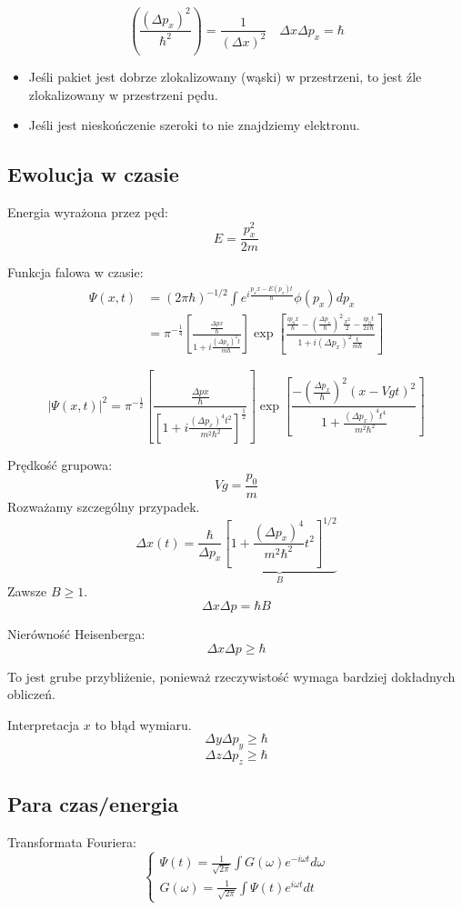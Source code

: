 \[
(\frac{(\Delta p_x)^2}{\hbar^2}) = \frac{1}{(\Delta x)^2} \quad \Delta x \Delta p_x = \hbar
\]
\begin{itemize}
    \item Jeśli pakiet jest dobrze zlokalizowany (wąski) w przestrzeni, to jest źle zlokalizowany w przestrzeni pędu.
    \item Jeśli jest nieskończenie szeroki to nie znajdziemy elektronu.
\end{itemize}

\subsection{Ewolucja w czasie}

Energia wyrażona przez pęd:
\[
E = \frac{p_x^2}{2m}
\]

Funkcja falowa w czasie:
\begin{align*}
\Psi(x,t) &= \left(2\pi\hbar \right)^{-1/2} \int e^{i\frac{p_x x - E(p_x)t}{\hbar}} \phi(p_x) dp_x \\
&= \pi^{-\frac{1}{4}}\left[\frac{\frac{\Delta p x}{\hbar}}{1+i\frac{(\Delta p_x)^2 t}{m\hbar}}\right] \exp\left[\frac{\frac{ip_0 x}{\hbar}-\left(\frac{\Delta p_x}{\hbar}\right)^2\frac{x^2}{2}-\frac{ip_0 t}{2x\hbar}}{1+i(\Delta p_x)^2 \frac{t}{m\hbar}}\right]
\end{align*}

\[
|\Psi(x,t)|^2 = \pi^{-\frac{1}{2}}\left[\frac{\frac{\Delta p x}{\hbar}}{\left[1+i\frac{(\Delta p_x)^4 t^2}{m^2\hbar^2}\right]^{\frac{1}{2}}}\right] \exp\left[\frac{-\left(\frac{\Delta p_x}{\hbar}\right)^2(x-Vgt)^2}{1+\frac{(\Delta p_x)^4 t^4}{m^2\hbar^2}}\right]
\]

Prędkość grupowa:
\[
Vg = \frac{p_0}{m}
\]
Rozważamy szczególny przypadek.
\[
\Delta x (t) = \frac{\hbar}{\Delta p_x} \underbrace{\left[1 + \frac{(\Delta p_x)^4}{m^2\hbar^2}t^2\right]^{1/2}}_{B}
\]
Zawsze $B \geq 1$.
\[
\Delta x \Delta p = \hbar B
\]

Nierówność Heisenberga:
\[
\Delta x \Delta p \geq \hbar
\]

To jest grube przybliżenie, ponieważ rzeczywistość wymaga bardziej dokładnych obliczeń.

Interpretacja $x$ to błąd wymiaru.
\[
\Delta y \Delta p_y \geq \hbar
\]
\[
\Delta z \Delta p_z \geq \hbar
\]

\subsection{Para czas/energia}
Transformata Fouriera:
\[
\begin{cases}
\Psi(t) = \frac{1}{\sqrt{2\pi}} \int G(\omega) e^{-i\omega t} d\omega\\
G(\omega) = \frac{1}{\sqrt{2\pi}} \int \Psi(t) e^{i\omega t} dt
\end{cases}
\]

